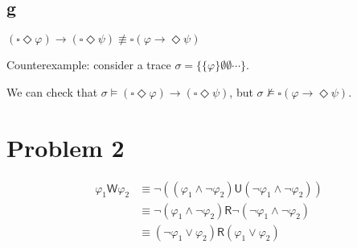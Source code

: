\subsection{g}

$(\square \Diamond \varphi) \rightarrow (\square \Diamond \psi) \not \equiv \square (\varphi \rightarrow \Diamond \psi)$

Counterexample: consider a trace $\sigma = \{\{\varphi\} \emptyset \emptyset \cdots \}$.

We can check that $\sigma \models (\square \Diamond \varphi) \rightarrow (\square \Diamond \psi)$, but $\sigma \not \models \square (\varphi \rightarrow \Diamond \psi)$.

\section{Problem 2}

$$
\begin{aligned}
    \varphi_1 \mathsf{W} \varphi_2
    & \equiv \neg ((\varphi_1 \wedge \neg \varphi_2) \mathsf{U} (\neg \varphi_1 \wedge \neg \varphi_2)) \\
    & \equiv \neg (\varphi_1 \wedge \neg \varphi_2) \mathsf{R} \neg (\neg \varphi_1 \wedge \neg \varphi_2) \\
    & \equiv (\neg \varphi_1 \vee \varphi_2) \mathsf{R} (\varphi_1 \vee \varphi_2) \\
\end{aligned}
$$
